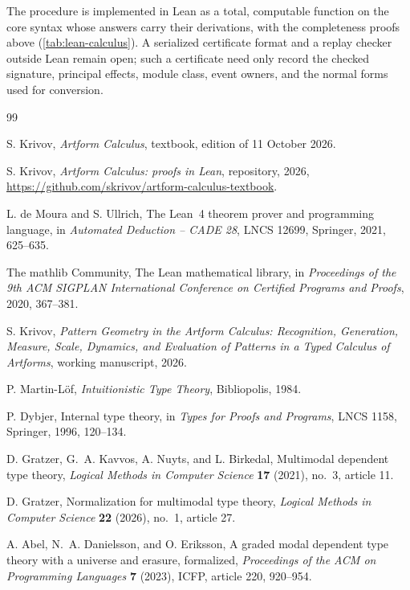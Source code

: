 \documentclass[11pt]{article}
\numberwithin{equation}{section}
\theoremstyle{definition}
\theoremstyle{plain}
\theoremstyle{remark}
\begin{document}
The procedure is implemented in Lean as a total, computable function on the
core syntax whose answers carry their derivations, with the completeness
proofs above (\cref{tab:lean-calculus}).  A serialized certificate format and
a replay checker outside Lean remain open; such a certificate need only
record the checked signature, principal effects, module class, event owners,
and the normal forms used for conversion.

\clearpage
\begin{thebibliography}{99}
\small
\setlength{\itemsep}{2pt}

S. Krivov,
\emph{Artform Calculus},
textbook, edition of 11 October 2026.

S. Krivov,
\emph{Artform Calculus: proofs in Lean},
repository, 2026,
\url{https://github.com/skrivov/artform-calculus-textbook}.

L. de Moura and S. Ullrich,
The Lean~4 theorem prover and programming language,
in \emph{Automated Deduction -- CADE 28}, LNCS 12699, Springer, 2021,
625--635.

The mathlib Community,
The Lean mathematical library,
in \emph{Proceedings of the 9th ACM SIGPLAN International Conference on
Certified Programs and Proofs}, 2020, 367--381.

S. Krivov,
\emph{Pattern Geometry in the Artform Calculus: Recognition, Generation,
Measure, Scale, Dynamics, and Evaluation of Patterns in a Typed Calculus of
Artforms},
working manuscript, 2026.

P. Martin-L\"of,
\emph{Intuitionistic Type Theory},
Bibliopolis, 1984.

P. Dybjer,
Internal type theory,
in \emph{Types for Proofs and Programs}, LNCS 1158, Springer, 1996,
120--134.

D. Gratzer, G.~A. Kavvos, A. Nuyts, and L. Birkedal,
Multimodal dependent type theory,
\emph{Logical Methods in Computer Science} \textbf{17} (2021), no.~3,
article 11.

D. Gratzer,
Normalization for multimodal type theory,
\emph{Logical Methods in Computer Science} \textbf{22} (2026), no.~1,
article 27.

A. Abel, N.~A. Danielsson, and O. Eriksson,
A graded modal dependent type theory with a universe and erasure, formalized,
\emph{Proceedings of the ACM on Programming Languages} \textbf{7} (2023),
ICFP, article 220, 920--954.


\end{thebibliography}
\end{document}
